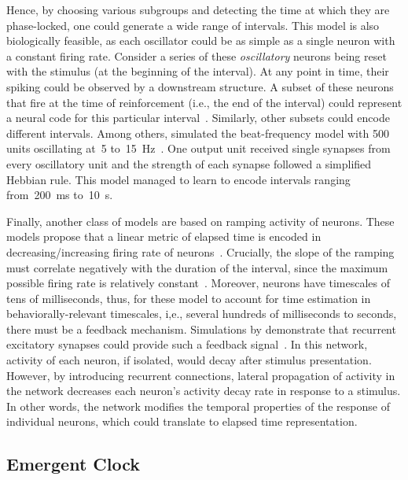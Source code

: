 Hence, by choosing various subgroups and detecting the time at which they are phase-locked, one could generate a wide range of intervals.
This model is also biologically feasible, as each oscillator could be as simple as a single neuron with a constant firing rate.
Consider a series of these \textit{oscillatory} neurons being reset with the stimulus (at the beginning of the interval).
At any point in time, their spiking could be observed by a downstream structure.
A subset of these neurons that fire at the time of reinforcement (i.e., the end of the interval) could represent a neural code for this particular interval~\cite{Matell2004CogBrainRes}.
Similarly, other subsets could encode different intervals.
Among others,  simulated the beat-frequency model with 500 units oscillating at~5 to~15~Hz~\cite{Miali1989NeuComp}.
One output unit received single synapses from every oscillatory unit and the strength of each synapse followed a simplified Hebbian rule.
This model managed to learn to encode intervals ranging from~200~ms to~10~s.
\par
Finally, another class of models are based on ramping activity of neurons.
These models propose that a linear metric of elapsed time is encoded in decreasing/increasing firing rate of neurons~\cite{Paton2018NeuronRev}.
Crucially, the slope of the ramping must correlate negatively with the duration of the interval, since the maximum possible firing rate is relatively constant~\cite{Jazayeri2015CurrBiol}.
Moreover, neurons have timescales of tens of milliseconds, thus, for these model to account for time estimation in behaviorally-relevant timescales, i,e., several hundreds of milliseconds to seconds, there must be a feedback mechanism.
Simulations by \citeauthor{Gavornik20009PNAS} demonstrate that recurrent excitatory synapses could provide such a feedback signal~\cite{Gavornik20009PNAS}.
In this network, activity of each neuron, if isolated, would decay after stimulus presentation.
However, by introducing recurrent connections, lateral propagation of activity in the network decreases each neuron's activity decay rate in response to a stimulus.
In other words, the network modifies the temporal properties of the response of individual neurons, which could translate to elapsed time representation.

\subsection{Emergent Clock}
\label{ch:intro:InternalTimeEstimation:Emergent}

